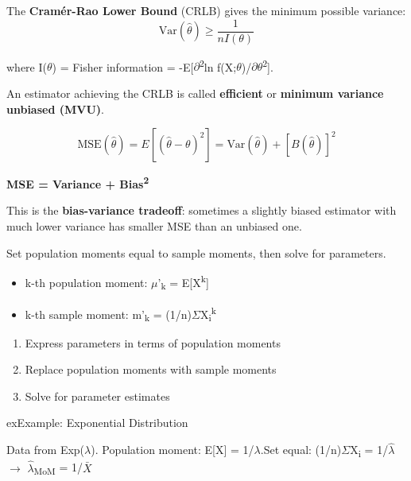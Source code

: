 The \textbf{Cramér-Rao Lower Bound} (CRLB) gives the minimum possible variance:\PSbr{}\[\text{Var}(\hat{\theta}) \geq \frac{1}{nI(\theta)}\]

where I(\ensuremath{\theta}) = Fisher information = -E[\ensuremath{\partial}\textsuperscript{2}ln f(X;\ensuremath{\theta})/\ensuremath{\partial}\ensuremath{\theta}\textsuperscript{2}].

An estimator achieving the CRLB is called \textbf{efficient} or \textbf{minimum variance unbiased (MVU)}.


\[\text{MSE}(\hat{\theta}) = E[(\hat{\theta} - \theta)^2] = \text{Var}(\hat{\theta}) + [B(\hat{\theta})]^2\]

\textbf{MSE = Variance + Bias\textsuperscript{2}}

This is the \textbf{bias-variance tradeoff}: sometimes a slightly biased estimator with much lower variance has smaller MSE than an unbiased one.



Set population moments equal to sample moments, then solve for parameters.

\begin{itemize}
\tightlist
\item
  k-th population moment: \ensuremath{\mu}’\textsubscript{k} = E[X\textsuperscript{k}]
\item
  k-th sample moment: m’\textsubscript{k} = (1/n)\ensuremath{\Sigma}X\textsubscript{i}\textsuperscript{k}
\end{itemize}


\begin{enumerate}
\def\labelenumi{\arabic{enumi}.}
\tightlist
\item
  Express parameters in terms of population moments
\item
  Replace population moments with sample moments
\item
  Solve for parameter estimates
\end{enumerate}

\begin{PSbox}[unbreakable]{ex}{Example: Exponential Distribution}

Data from Exp(\ensuremath{\lambda}). Population moment: E[X] = 1/\ensuremath{\lambda}.\PSbr{}Set equal: (1/n)\ensuremath{\Sigma}X\textsubscript{i} = 1/\ensuremath{\hat{\lambda}} \ensuremath{\to} \ensuremath{\hat{\lambda}}\textsubscript{MoM} = 1/\ensuremath{\bar{X}}

\end{PSbox}

